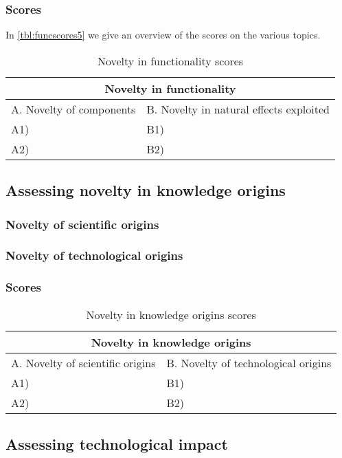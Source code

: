 \subsubsection{Scores}
In \autoref{tbl:funcscores5} we give an overview of the scores on the various
topics.

\begin{table}[h]
\centering
\begin{tabular}{l l}
\hline
\multicolumn{2}{|c|}{Novelty in functionality} \\
\hline
A. Novelty of components & B. Novelty in natural effects exploited\\
A1) & B1)\\ 
A2) & B2)\\ 
\hline
\end{tabular}
\caption{Novelty in functionality scores}
\label{tbl:funcscores5}
\end{table}

\subsection{Assessing novelty in knowledge origins}
\subsubsection{Novelty of scientific origins}

\subsubsection{Novelty of technological origins}

\subsubsection{Scores}
\begin{table}[h]
\centering
\begin{tabular}{l l}
\hline
\multicolumn{2}{|c|}{Novelty in knowledge origins} \\
\hline
A. Novelty of scientific origins & B. Novelty of technological origins\\
A1) & B1)\\ 
A2) & B2)\\ 
\hline
\end{tabular}
\caption{Novelty in knowledge origins scores}
\label{tbl:origscores5}
\end{table}

\subsection{Assessing technological impact}
